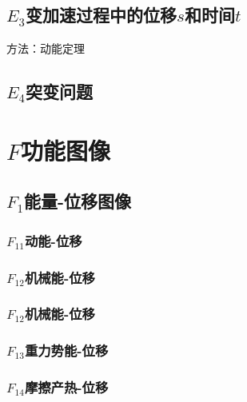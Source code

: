 \documentclass[lang=cn,10pt]{elegantbook}
\begin{document}
		       \subsection{$E_3$变加速过程中的位移$s$和时间$t$}
		       
		       方法：动能定理
		       
		       \subsection{$E_4$突变问题}
		       \vspace{3cm}
		       
		       \section{$F$功能图像}
		       \subsection{$F_1$能量-位移图像}
		       \subsubsection{$F_{11}$动能-位移}
		       \vspace{1cm}
		       
		       \subsubsection{$F_{12}$机械能-位移}
		       \vspace{1cm}
		       
		       \subsubsection{$F_{12}$机械能-位移}
		       \vspace{1cm}
		       
		       \subsubsection{$F_{13}$重力势能-位移}
		       \vspace{1cm}
		       
		       \subsubsection{$F_{14}$摩擦产热-位移}
		       \vspace{1cm}
		       
\end{document}

